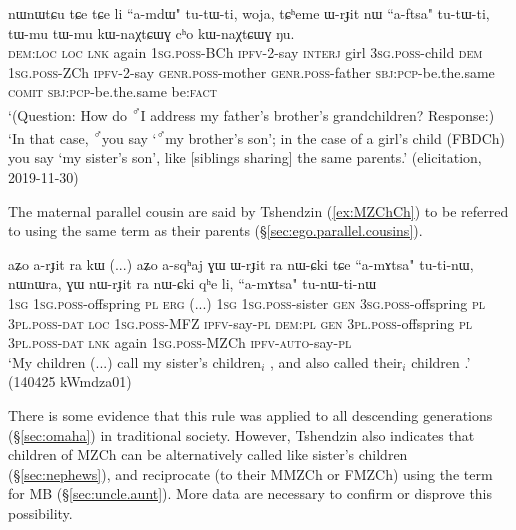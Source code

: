 \begin{exe}
\ex \label{ex:FBChCh}
\gll nɯnɯtɕu tɕe tɕe li ``a-mdɯ" tu-tɯ-ti, woja, tɕʰeme ɯ-rɟit nɯ ``a-ftsa" tu-tɯ-ti, tɯ-mu tɯ-mu kɯ-naχtɕɯɣ cʰo kɯ-naχtɕɯɣ ŋu.\\
\textsc{dem}:\textsc{loc} \textsc{loc} \textsc{lnk} again \textsc{1sg}.\textsc{poss}-BCh \textsc{ipfv}-2-say \textsc{interj} girl \textsc{3sg}.\textsc{poss}-child \textsc{dem} \textsc{1sg}.\textsc{poss}-ZCh  \textsc{ipfv}-2-say \textsc{genr}.\textsc{poss}-mother \textsc{genr}.\textsc{poss}-father \textsc{sbj}:\textsc{pcp}-be.the.same \textsc{comit} \textsc{sbj}:\textsc{pcp}-be.the.same be:\textsc{fact}\\
\glt `(Question: How do \textsuperscript{♂}I address  my father's brother's grandchildren? Response:) `In that case, \textsuperscript{♂}you say  `\textsuperscript{♂}my brother's son'; in the case of a girl's child (FBDCh) you say  `my sister's son', like [siblings sharing] the same parents.' (elicitation, 2019-11-30)
\end{exe}

The maternal parallel cousin are said by Tshendzin (\ref{ex:MZChCh}) to be referred to using the same term as their parents  (§\ref{sec:ego.parallel.cousins}).

\begin{exe}
\ex \label{ex:MZChCh}
\gll aʑo a-rɟit ra kɯ (...) aʑo a-sqʰaj ɣɯ ɯ-rɟit ra nɯ-ɕki  tɕe ``a-mɤtsa" tu-ti-nɯ, nɯnɯra, ɣɯ nɯ-rɟit ra nɯ-ɕki qʰe li, ``a-mɤtsa" tu-nɯ-ti-nɯ  \\
\textsc{1sg} \textsc{1sg}.\textsc{poss}-offspring \textsc{pl} \textsc{erg} (...) \textsc{1sg} \textsc{1sg}.\textsc{poss}-sister \textsc{gen} \textsc{3sg}.\textsc{poss}-offspring \textsc{pl} \textsc{3pl}.\textsc{poss}-\textsc{dat} \textsc{loc} \textsc{1sg}.\textsc{poss}-MFZ \textsc{ipfv}-say-\textsc{pl} \textsc{dem}:\textsc{pl} \textsc{gen} \textsc{3pl}.\textsc{poss}-offspring \textsc{pl} \textsc{3pl}.\textsc{poss}-\textsc{dat} \textsc{lnk} again \textsc{1sg}.\textsc{poss}-MZCh \textsc{ipfv}-\textsc{auto}-say-\textsc{pl} \\
\glt `My children (...) call my sister's children$_i$ , and also called their$_i$ children .' (140425 kWmdza01)
\end{exe}

There is some evidence that this rule was applied to all descending generations (§\ref{sec:omaha}) in traditional society. However, Tshendzin  also indicates that children of MZCh can be alternatively called  like sister's children (§\ref{sec:nephews}), and reciprocate (to their MMZCh or FMZCh) using the term for MB (§\ref{sec:uncle.aunt}). More data are necessary to confirm or disprove this possibility.

